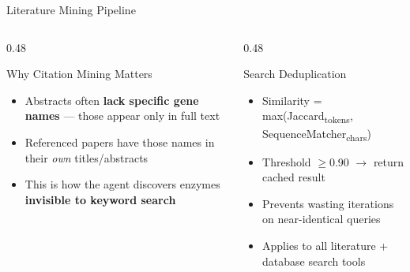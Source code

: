\documentclass[aspectratio=169, 11pt]{beamer}
\begin{document}
\begin{frame}{Literature Mining Pipeline}
\begin{center}
\begin{tikzpicture}
\end{tikzpicture}
\end{center}

\vspace{-2pt}
\begin{columns}[T]
\begin{column}{0.48\textwidth}
\begin{alertblock}{\small Why Citation Mining Matters}
\vspace{-2pt}
\begin{itemize}\scriptsize
\setlength\itemsep{1pt}
\item Abstracts often \textbf{lack specific gene names} --- those appear only in full text
\item Referenced papers have those names in their \textit{own} titles/abstracts
\item This is how the agent discovers enzymes \textbf{invisible to keyword search}
\end{itemize}
\end{alertblock}
\end{column}
\begin{column}{0.48\textwidth}
\begin{block}{\small Search Deduplication}
\vspace{-2pt}
\begin{itemize}\scriptsize
\setlength\itemsep{1pt}
\item Similarity = max(Jaccard\textsubscript{tokens}, SequenceMatcher\textsubscript{chars})
\item Threshold $\geq$0.90 $\rightarrow$ return cached result
\item Prevents wasting iterations on near-identical queries
\item Applies to all literature + database search tools
\end{itemize}
\end{block}
\end{column}
\end{columns}
\end{frame}
\end{document}
